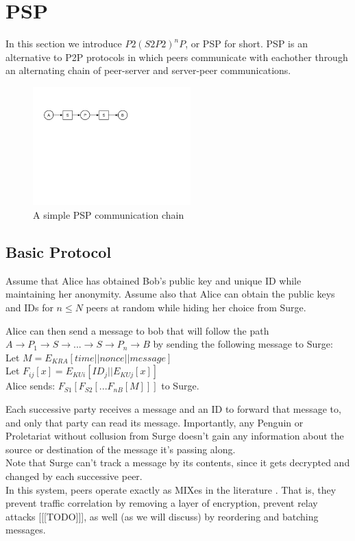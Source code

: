 \documentclass{paper}
\begin{document}
\section{PSP}
In this section we introduce
$P2(S2P2)^nP$, or PSP for short. PSP is an alternative to P2P protocols in which peers communicate with eachother through an alternating chain of peer-server and server-peer communications.

\begin{figure}[ht]
  \includegraphics[width=230px]{PSP.png}
  \caption{A simple PSP communication chain}
\end{figure}

\subsection{Basic Protocol}
Assume that Alice has obtained Bob's public key and unique ID while maintaining her anonymity. Assume also that Alice can obtain the public keys and IDs for $n \le N$ peers at random while hiding her choice from Surge. 

Alice can then send a message to bob that will follow the path $A \rightarrow P_1 \rightarrow S \rightarrow ... \rightarrow S \rightarrow P_n \rightarrow B$ by sending the following message to Surge: 
\\
Let $M = E_{KRA}[  time || nonce || message ]$
\\Let $F_{ij}[x] = E_{KUi}[ ID_j || E_{KUj}[ x ] ]$
\\
Alice sends: $F_{S1}[F_{S2}[...F_{nB}[ M ]]]$ to Surge. 

Each successive party receives a message and an ID to forward that message to, and only that party can read its message. Importantly, any Penguin or Proletariat without collusion from Surge doesn't gain any information about the source or destination of the message it's passing along. 
\\
Note that Surge can't track a message by its contents, since it gets decrypted and changed by each successive peer. 
\\
In this system, peers operate exactly as MIXes in the literature \cite{chaum-mix} . That is, they prevent traffic correlation by removing a layer of encryption, prevent relay attacks [[[TODO]]], as well (as we will discuss) by reordering and batching messages. 
\end{document}
